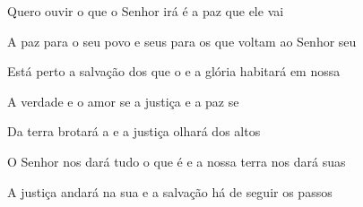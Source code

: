 \begin{multicols}{2}
    \begin{greenumerate}
      \item {}Quero ouvir o que o Senhor irá  é a paz que ele vai 

      \item {}A paz para o seu povo e seus  para os que voltam ao Senhor seu 

      \item {}Está perto a salvação dos que o  e a glória habitará em nossa 

      \item {}A verdade e o amor se  a justiça e a paz se 

      \item {}Da terra brotará a  e a justiça olhará dos altos 

      \item {}O Senhor nos dará tudo o que é  e a nossa terra nos dará suas 

      \item {}A justiça andará na sua  e a salvação há de seguir os passos 
    \end{greenumerate}
  \end{multicols}